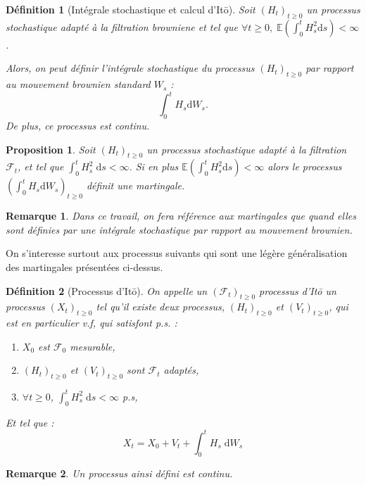 \documentclass[openany]{book}
\newcommand{\F}{\mathscr{F}}
\newcommand{\E}{\mathbb{E}}
\newcommand{\1}{\mathbbm{1}}
\renewcommand{\d}{\mathrm{d}}
\theoremstyle{thmfont}
\theoremstyle{deffont}
\newtheorem{definition}[definition]{Définition}
\theoremstyle{thmfont}
\newtheorem{prop}[prop]{Proposition}
\theoremstyle{deffont}
\newtheorem{remark}[remark]{Remarque}
\begin{document}
\begin{definition}[Intégrale stochastique et calcul d'Itō]
  Soit $(H_t)_{t \geq 0}$ un processus stochastique adapté à la filtration browniene et tel que $\forall t \geq 0, \; \E \left(\int_0^t H_s^2 \d s\right) < \infty$.

  Alors, on peut définir \textit{l'intégrale stochastique} du processus $(H_t)_{t\geq0}$ par rapport au mouvement brownien standard $W_s$ :
  $$ \int_0^t H_s \d W_s.$$
  De plus, ce processus est continu.
\end{definition}


\begin{prop} Soit $(H_t)_{t \geq 0}$ un processus stochastique adapté à la filtration  $\F_t$, et tel que $\int_0^t H_s^2\;\d s < \infty$. Si en plus $\E\left(\int_0^tH_s^2 \d s\right) < \infty$ alors le processus $(\int_0^t H_s \d W_s)_{t\geq 0}$ définit une martingale. 
\end{prop}

\begin{remark}
  Dans ce travail, on fera référence aux martingales que quand elles sont définies par une intégrale stochastique par rapport au mouvement brownien.
\end{remark}


On s'interesse surtout aux processus suivants qui sont une légère généralisation des martingales présentées ci-dessus.
\begin{definition}[Processus d'Itō] On appelle un $(\F_t)_{t\geq0}$ \textit{processus d'Itō} un processus $(X_t)_{t\geq0}$ tel qu'il existe deux processus, $(H_t)_{t\geq0}$ et $(V_t)_{t\geq 0}$, qui est en particulier v.f, qui satisfont p.s. :
  \begin{enumerate}
  \item $X_0$ est $\F_0$ mesurable,
  \item $(H_t)_{t\geq0}$ et $(V_t)_{t\geq0}$ sont $\F_t$ adaptés,
  \item $\forall t \geq 0$, $\int_0^t H_s^2\;\d s < \infty$ p.s,
    \end{enumerate}

    Et tel que :
   $$X_t = X_0 + V_t + \int_0^t H_s \;\d W_s$$
 \end{definition}
 \begin{remark}
   \label{rmk:ContinuitePrIto}
   Un processus ainsi défini est continu.
 \end{remark}
 
\end{document}
